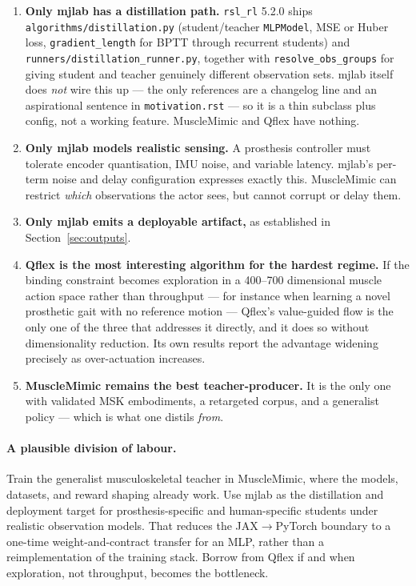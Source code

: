\documentclass[11pt,a4paper]{article}
\begin{document}
\begin{enumerate}[leftmargin=1.4em,itemsep=0.4em]
\item \textbf{Only mjlab has a distillation path.} \texttt{rsl\_rl} 5.2.0 ships
\texttt{algorithms/distillation.py} (student/teacher \texttt{MLPModel}, MSE or Huber loss,
\texttt{gradient\_length} for BPTT through recurrent students) and
\texttt{runners/distillation\_runner.py}, together with \texttt{resolve\_obs\_groups} for
giving student and teacher genuinely different observation sets. mjlab itself does
\emph{not} wire this up --- the only references are a changelog line and an aspirational
sentence in \texttt{motivation.rst} --- so it is a thin subclass plus config, not a
working feature. MuscleMimic and Qflex have nothing.

\item \textbf{Only mjlab models realistic sensing.} A prosthesis controller must tolerate
encoder quantisation, IMU noise, and variable latency. mjlab's per-term noise and delay
configuration expresses exactly this. MuscleMimic can restrict \emph{which} observations
the actor sees, but cannot corrupt or delay them.

\item \textbf{Only mjlab emits a deployable artifact,} as established in
Section~\ref{sec:outputs}.

\item \textbf{Qflex is the most interesting algorithm for the hardest regime.} If the
binding constraint becomes exploration in a 400--700 dimensional muscle action space
rather than throughput --- for instance when learning a novel prosthetic gait with no
reference motion --- Qflex's value-guided flow is the only one of the three that
addresses it directly, and it does so without dimensionality reduction. Its own results
report the advantage widening precisely as over-actuation increases.

\item \textbf{MuscleMimic remains the best teacher-producer.} It is the only one with
validated MSK embodiments, a retargeted corpus, and a generalist policy --- which is what
one distils \emph{from}.
\end{enumerate}

\paragraph{A plausible division of labour.} Train the generalist musculoskeletal teacher
in MuscleMimic, where the models, datasets, and reward shaping already work. Use mjlab as
the distillation and deployment target for prosthesis-specific and human-specific students
under realistic observation models. That reduces the JAX$\rightarrow$PyTorch boundary to a
one-time weight-and-contract transfer for an MLP, rather than a reimplementation of the
training stack. Borrow from Qflex if and when exploration, not throughput, becomes the
bottleneck.
\end{document}
